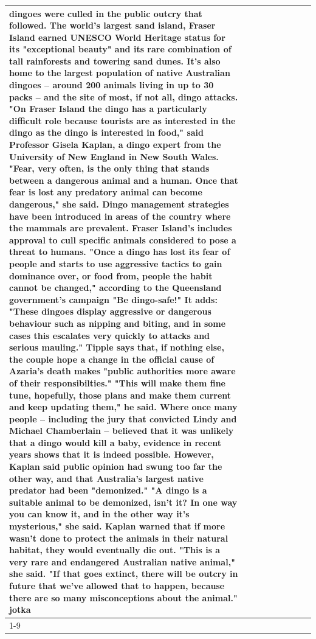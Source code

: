\begin{table}[H]
\begin{tabular}{lllrlllll}
dingoes were culled in the public outcry that followed. The world's largest sand island, Fraser Island earned UNESCO World Heritage status for its "exceptional beauty" and its rare combination of tall rainforests and towering sand dunes. It's also home to the largest population of native Australian dingoes -- around 200 animals living in up to 30 packs -- and the site of most, if not all, dingo attacks. "On Fraser Island the dingo has a particularly difficult role because tourists are as interested in the dingo as the dingo is interested in food," said Professor Gisela Kaplan, a dingo expert from the University of New England in New South Wales. "Fear, very often, is the only thing that stands between a dangerous animal and a human. Once that fear is lost any predatory animal can become dangerous," she said. Dingo management strategies have been introduced in areas of the country where the mammals are prevalent. Fraser Island's includes approval to cull specific animals considered to pose a threat to humans. "Once a dingo has lost its fear of people and starts to use aggressive tactics to gain dominance over, or food from, people the habit cannot be changed," according to the Queensland government's campaign "Be dingo-safe!" It adds: "These dingoes display aggressive or dangerous behaviour such as nipping and biting, and in some cases this escalates very quickly to attacks and serious mauling." Tipple says that, if nothing else, the couple hope a change in the official cause of Azaria's death makes "public authorities more aware of their responsibilties." "This will make them fine tune, hopefully, those plans and make them current and keep updating them," he said. Where once many people -- including the jury that convicted Lindy and Michael Chamberlain -- believed that it was unlikely that a dingo would kill a baby, evidence in recent years shows that it is indeed possible. However, Kaplan said public opinion had swung too far the other way, and that Australia's largest native predator had been "demonized." "A dingo is a suitable animal to be demonized, isn't it? In one way you can know it, and in the other way it's mysterious," she said. Kaplan warned that if more wasn't done to protect the animals in their natural habitat, they would eventually die out. "This is a very rare and endangered Australian native animal," she said. "If that goes extinct, there will be outcry in future that we've allowed that to happen, because there are so many misconceptions about the animal." jotka \\
\cline{1-9}

\end{tabular}
\end{table}
